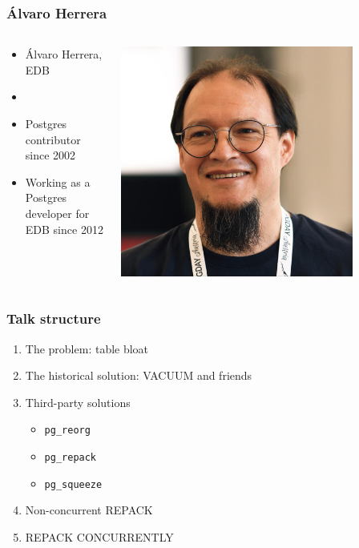 \begin{frame}
  \frametitle{Álvaro Herrera}

  \begin{columns}[T]
    \begin{column}{0.8\textwidth}
      \begin{itemize}
	\item Álvaro Herrera, EDB
	\item \href{mailto:alvherre@kurilemu.de}{\color{black}{alvherre@kurilemu.de}}
	\item Postgres contributor since 2002
	\item Working as a Postgres developer for EDB since 2012
      \end{itemize}
    \end{column}
    \begin{column}{0.2\textwidth}
      \includegraphics[width=0.8\textwidth]{alvaro-faceshot.jpg}
    \end{column}
  \end{columns}
\end{frame}

\begin{frame}
  \frametitle{Talk structure}
  \begin{enumerate}
    \item The problem: table bloat
    \item The historical solution: VACUUM and friends
    \item Third-party solutions
      \begin{itemize}
	\item \texttt{pg\_reorg}
	\item \texttt{pg\_repack}
	\item \texttt{pg\_squeeze}
      \end{itemize}
    \item Non-concurrent REPACK
    \item REPACK CONCURRENTLY
  \end{enumerate}
\end{frame}

